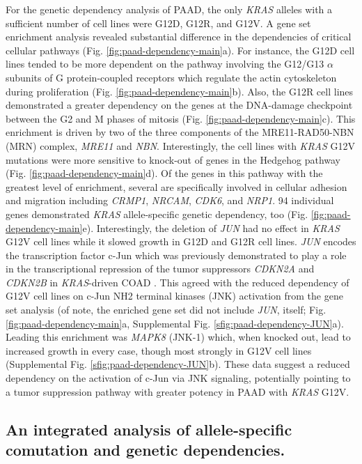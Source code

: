 \documentclass[english, 10pt, letterpaper]{article}
\newcommand{\KRAS}{\emph{KRAS}}
\begin{document}
For the genetic dependency analysis of PAAD, the only \KRAS{} alleles with a sufficient number of cell lines were G12D, G12R, and G12V.
A gene set enrichment analysis revealed substantial difference in the dependencies of critical cellular pathways (Fig. \ref{fig:paad-dependency-main}a).
For instance, the G12D cell lines tended to be more dependent on the pathway involving the G12/G13 $\alpha$ subunits of G protein-coupled receptors which regulate the actin cytoskeleton during proliferation \cite{Worzfeld2008G12/G13-mediatedDisease., Siehler2009RegulationReceptors., Suzuki2009RegulationPathways.} (Fig. \ref{fig:paad-dependency-main}b).
Also, the G12R cell lines demonstrated a greater dependency on the genes at the DNA-damage checkpoint between the G2 and M phases of mitosis (Fig. \ref{fig:paad-dependency-main}c).
This enrichment is driven by two of the three components of the MRE11-RAD50-NBN (MRN) complex, \emph{MRE11} and \emph{NBN}.
Interestingly, the cell lines with \KRAS{} G12V mutations were more sensitive to knock-out of genes in the Hedgehog pathway (Fig. \ref{fig:paad-dependency-main}d).
Of the genes in this pathway with the greatest level of enrichment, several are specifically involved in cellular adhesion and migration including \emph{CRMP1}, \emph{NRCAM}, \emph{CDK6}, and \emph{NRP1}.
94 individual genes demonstrated \KRAS{} allele-specific genetic dependency, too (Fig. \ref{fig:paad-dependency-main}e).
Interestingly, the deletion of \emph{JUN} had no effect in \KRAS{} G12V cell lines while it slowed growth in G12D and G12R cell lines.
\emph{JUN} encodes the transcription factor c-Jun which was previously demonstrated to play a role in the transcriptional repression of the tumor suppressors \emph{CDKN2A} and \emph{CDKN2B} in \KRAS{}-driven COAD \cite{Serra2014APhenotype.}.
This agreed with the reduced dependency of G12V cell lines on c-Jun NH2 terminal kinases (JNK) activation from the gene set analysis (of note, the enriched gene set did not include \emph{JUN}, itself; Fig. \ref{fig:paad-dependency-main}a, Supplemental Fig. \ref{sfig:paad-dependency-JUN}a).
Leading this enrichment was \emph{MAPK8} (JNK-1) which, when knocked out, lead to increased growth in every case, though most strongly in G12V cell lines (Supplemental Fig. \ref{sfig:paad-dependency-JUN}b).
These data suggest a reduced dependency on the activation of c-Jun via JNK signaling, potentially pointing to a tumor suppression pathway with greater potency in PAAD with \KRAS{} G12V.


\subsection*{An integrated analysis of allele-specific comutation and genetic dependencies.}
\end{document}
